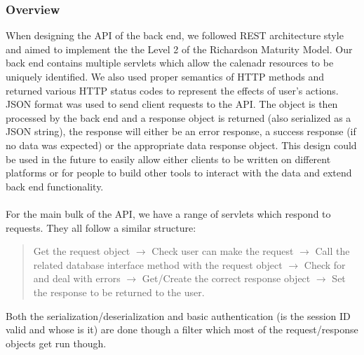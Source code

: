 \documentclass[10pt,a4paper]{article}
\begin{document}
\subsubsection{Overview}
When designing the API of the back end, we followed REST architecture style and aimed to implement the the Level 2 of the Richardson Maturity Model. Our back end contains multiple servlets which allow the calenadr resources to be uniquely identified. We also used proper semantics of HTTP methods and returned various HTTP status codes to represent the effects of user's actions. JSON format was used to send client requests to the API. The object is then processed by the back end and a response object is returned (also serialized as a JSON string), the response will either be an error response, a success response (if no data was expected) or the appropriate data response object. This design could be used in the future to easily allow either clients to be written on different platforms or for people to build other tools to interact with the data and extend back end functionality. 
\\
\\
\noindent For the main bulk of the API, we have a range of servlets which respond to requests. They all follow a similar structure:
\begin{quote}
\centering
Get the request object $\rightarrow$ Check user can make the request $\rightarrow$ Call the related database interface method with the request object $\rightarrow$ Check for and deal with errors $\rightarrow$ Get/Create the correct response object $\rightarrow$ Set the response to be returned to the user.
\end{quote}
Both the serialization/deserialization and basic authentication (is the session ID valid and whose is it) are done though a filter which most of the request/response objects get run though.
\\
\\
\end{document}
